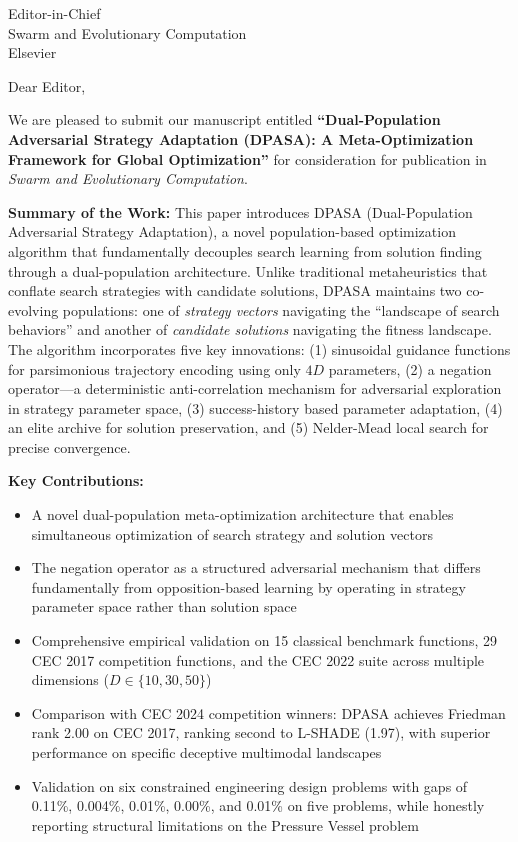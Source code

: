 \documentclass[11pt]{letter}
\date{\today}
\begin{document}
\begin{letter}{Editor-in-Chief\\
Swarm and Evolutionary Computation\\
Elsevier}

\opening{Dear Editor,}

We are pleased to submit our manuscript entitled \textbf{``Dual-Population Adversarial Strategy Adaptation (DPASA): A Meta-Optimization Framework for Global Optimization''} for consideration for publication in \textit{Swarm and Evolutionary Computation}.

\textbf{Summary of the Work:}
This paper introduces DPASA (Dual-Population Adversarial Strategy Adaptation), a novel population-based optimization algorithm that fundamentally decouples search learning from solution finding through a dual-population architecture. Unlike traditional metaheuristics that conflate search strategies with candidate solutions, DPASA maintains two co-evolving populations: one of \textit{strategy vectors} navigating the ``landscape of search behaviors'' and another of \textit{candidate solutions} navigating the fitness landscape. The algorithm incorporates five key innovations: (1) sinusoidal guidance functions for parsimonious trajectory encoding using only $4D$ parameters, (2) a negation operator---a deterministic anti-correlation mechanism for adversarial exploration in strategy parameter space, (3) success-history based parameter adaptation, (4) an elite archive for solution preservation, and (5) Nelder-Mead local search for precise convergence.

\textbf{Key Contributions:}
\begin{itemize}
    \item A novel dual-population meta-optimization architecture that enables simultaneous optimization of search strategy and solution vectors
    \item The negation operator as a structured adversarial mechanism that differs fundamentally from opposition-based learning by operating in strategy parameter space rather than solution space
    \item Comprehensive empirical validation on 15 classical benchmark functions, 29 CEC 2017 competition functions, and the CEC 2022 suite across multiple dimensions ($D \in \{10, 30, 50\}$)
    \item Comparison with CEC 2024 competition winners: DPASA achieves Friedman rank 2.00 on CEC 2017, ranking second to L-SHADE (1.97), with superior performance on specific deceptive multimodal landscapes
    \item Validation on six constrained engineering design problems with gaps of 0.11\%, 0.004\%, 0.01\%, 0.00\%, and 0.01\% on five problems, while honestly reporting structural limitations on the Pressure Vessel problem
\end{itemize}


\end{letter}
\end{document}
